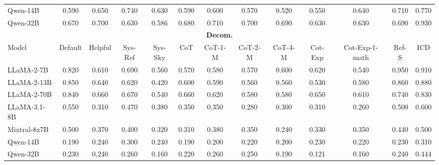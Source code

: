 \begin{table}[h]
{\begin{tabular}{lcccccccccccc}
Qwen-14B     & 0.590 & 0.650 & 0.740 & 0.630 & 0.590 & 0.600 & 0.570 & 0.520 & 0.550 & 0.640 & 0.710 & 0.770 \\
Qwen-32B     & 0.670 & 0.700 & 0.630 & 0.586 & 0.680 & 0.710 & 0.700 & 0.690 & 0.630 & 0.630 & 0.690 & 0.930 \\
\midrule
\multicolumn{13}{c}{\textbf{Decom.}} \\
\midrule
Model & Default & Helpful & Sys-Ref & Sys-Sky & CoT & CoT-1-M & CoT-2-M & CoT-4-M & Cot-Exp & Cot-Exp-1-math & Ref-S & ICD \\
\midrule
LLaMA-2-7B   & 0.820 & 0.610 & 0.690 & 0.560 & 0.570 & 0.580 & 0.570 & 0.600 & 0.620 & 0.540 & 0.950 & 0.910 \\
LLaMA-2-13B  & 0.850 & 0.640 & 0.620 & 0.420 & 0.600 & 0.590 & 0.560 & 0.560 & 0.530 & 0.580 & 0.860 & 0.880 \\
LLaMA-2-70B  & 0.840 & 0.660 & 0.670 & 0.540 & 0.660 & 0.620 & 0.580 & 0.580 & 0.650 & 0.610 & 0.740 & 0.830 \\
LLaMA-3.1-8B   & 0.550 & 0.310 & 0.470 & 0.380 & 0.350 & 0.350 & 0.280 & 0.300 & 0.310 & 0.260 & 0.500 & 0.600 \\
Mixtral-8x7B & 0.500 & 0.370 & 0.400 & 0.320 & 0.310 & 0.380 & 0.350 & 0.240 & 0.330 & 0.350 & 0.440 & 0.500 \\
Qwen-14B     & 0.190 & 0.240 & 0.300 & 0.240 & 0.190 & 0.200 & 0.220 & 0.200 & 0.230 & 0.220 & 0.230 & 0.310 \\
Qwen-32B     & 0.230 & 0.240 & 0.260 & 0.160 & 0.220 & 0.260 & 0.250 & 0.190 & 0.121 & 0.160 & 0.240 & 0.444 \\
\bottomrule
\end{tabular}%
}
\end{table}




\clearpage
